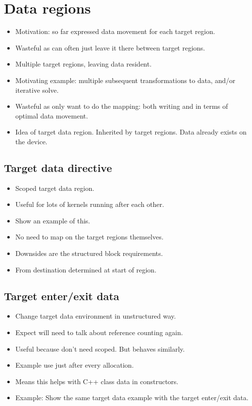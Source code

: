 \section{Data regions}
\begin{itemize}
  \item Motivation: so far expressed data movement for each target region.
  \item Wasteful as can often just leave it there between target regions.
  \item Multiple target regions, leaving data resident.
  \item Motivating example: multiple subsequent transformations to data, and/or iterative solve.
  \item Wasteful as only want to do the mapping: both writing and in terms of optimal data movement.
  \item Idea of target data region. Inherited by target regions. Data already exists on the device.
\end{itemize}

\subsection{Target data directive}
\begin{itemize}
  \item Scoped target data region.
  \item Useful for lots of kernels running after each other.
  \item Show an example of this.
  \item No need to map on the target regions themselves.
  \item Downsides are the structured block requirements.
  \item From destination determined at start of region.
\end{itemize}

\subsection{Target enter/exit data}
\begin{itemize}
  \item Change target data environment in unstructured way.
  \item Expect will need to talk about reference counting again.
  \item Useful because don't need scoped. But behaves similarly.
  \item Example use just after every allocation.
  \item Means this helps with C++ class data in constructors.
  \item Example: Show the same target data example with the target enter/exit data.
\end{itemize}

